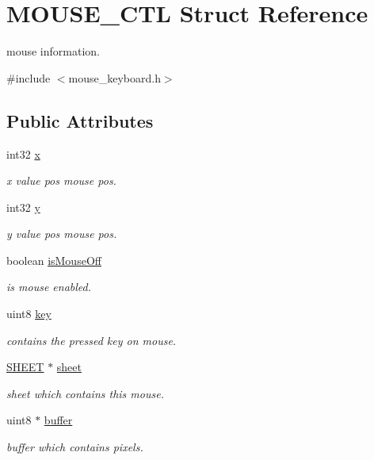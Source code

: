 \hypertarget{struct_m_o_u_s_e___c_t_l}{}\section{M\+O\+U\+S\+E\+\_\+\+C\+T\+L Struct Reference}
\label{struct_m_o_u_s_e___c_t_l}


mouse information.  




{\ttfamily \#include $<$mouse\+\_\+keyboard.\+h$>$}

\subsection*{Public Attributes}
\begin{DoxyCompactItemize}
\item 
int32 \hyperlink{struct_m_o_u_s_e___c_t_l_aa56dc48b53502faff745181e13a3ccfc}{x}
\begin{DoxyCompactList}\small\item\em x value pos mouse pos. \end{DoxyCompactList}\item 
int32 \hyperlink{struct_m_o_u_s_e___c_t_l_add9dc2e15464a86ea8e87d04dff862fb}{y}
\begin{DoxyCompactList}\small\item\em y value pos mouse pos. \end{DoxyCompactList}\item 
boolean \hyperlink{struct_m_o_u_s_e___c_t_l_a50ef4375066f58c21f75787b603805fb}{is\+Mouse\+Off}
\begin{DoxyCompactList}\small\item\em is mouse enabled. \end{DoxyCompactList}\item 
uint8 \hyperlink{struct_m_o_u_s_e___c_t_l_ade3f3716166e203684737f31cff4a753}{key}
\begin{DoxyCompactList}\small\item\em contains the pressed key on mouse. \end{DoxyCompactList}\item 
\hyperlink{struct_s_h_e_e_t}{S\+H\+E\+E\+T} $\ast$ \hyperlink{struct_m_o_u_s_e___c_t_l_ab7257a50dfc91c78666621e0af7bbbe7}{sheet}
\begin{DoxyCompactList}\small\item\em sheet which contains this mouse. \end{DoxyCompactList}\item 
uint8 $\ast$ \hyperlink{struct_m_o_u_s_e___c_t_l_aa66808aaae9beee8ea274abf02c85124}{buffer}
\begin{DoxyCompactList}\small\item\em buffer which contains pixels. \end{DoxyCompactList}\end{DoxyCompactItemize}


